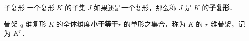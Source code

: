 \begin{definition}{子复形}
一个复形 $K$ 的子集 $J$ 如果还是一个复形，那么称 $J$ 是 $K$ 的\textbf{子复形}．
\end{definition}

\begin{definition}{骨架}
$q$ 维复形 $K$ 的全体维度\textbf{小于等于}$r$ 的单形之集合，称为 $K$ 的 $r$ 维骨架，记为 $K^r$．
\end{definition}










